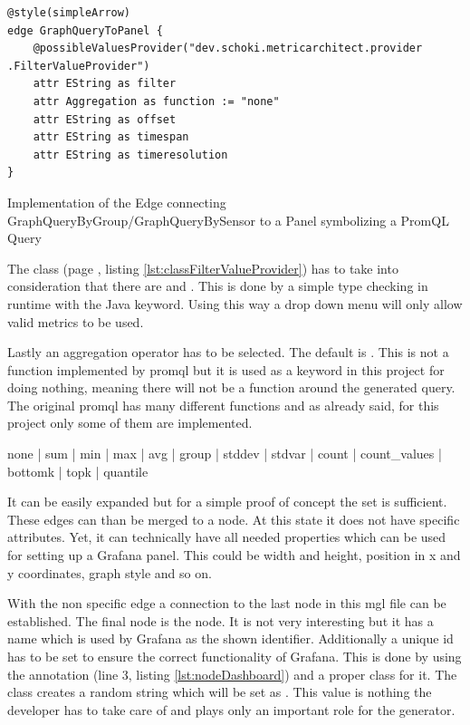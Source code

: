 \begin{listing}[H]
	\begin{verbatim}
@style(simpleArrow)
edge GraphQueryToPanel {
	@possibleValuesProvider("dev.schoki.metricarchitect.provider .FilterValueProvider")
	attr EString as filter
	attr Aggregation as function := "none"
	attr EString as offset
	attr EString as timespan
	attr EString as timeresolution
}
	\end{verbatim}
	\caption{Implementation of the Edge connecting GraphQueryByGroup/GraphQueryBySensor to a Panel symbolizing a PromQL Query}
	\label{lst:GraphQueryToPanel}
\end{listing}

The  class (page \pageref{lst:classFilterValueProvider}, listing \ref{lst:classFilterValueProvider}) has to take into consideration that there are  and . This is done by a simple type checking in runtime with the Java  keyword. Using this way a drop down menu will only allow valid metrics to be used.

Lastly an aggregation operator has to be selected. The default is . This is not a function implemented by \gls{promql} but it is used as a keyword in this project for doing nothing, meaning there will not be a function around the generated query. The original \gls{promql} has many different functions and as already said, for this project only some of them are implemented. 

\begin{center}
	none | sum | min | max | avg | group | stddev | stdvar | count | count\_values | bottomk | topk  | quantile
\end{center}

It can be easily expanded but for a simple proof of concept the set is sufficient. These edges can than be merged to a  node. At this state it does not have specific attributes. Yet, it can technically have all needed properties which can be used for setting up a Grafana panel. This could be width and height, position in x and y coordinates, graph style and so on.

With the non specific edge  a connection to the last node in this \gls{mgl} file can be established. The final node is the  node. It is not very interesting but it has a name which is used by Grafana as the shown identifier. Additionally a unique id has to be set to ensure the correct functionality of Grafana. This is done by using the  annotation (line 3, listing \ref{lst:nodeDashboard}) and a proper class for it. The class  creates a random string which will be set as . This value is nothing the developer has to take care of and plays only an important role for the generator.

